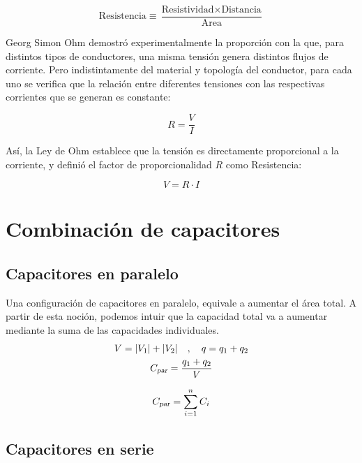 \documentclass[a5paper,12pt,twoside]{book}
\begin{document}
\begin{equation*}
    \text{Resistencia} \equiv \frac{\text{Resistividad} \times \text{Distancia}}{\text{Area}}
\end{equation*}

Georg Simon Ohm demostró experimentalmente la proporción con la que, para distintos tipos de conductores, una misma tensión genera distintos flujos de corriente. Pero indistintamente del material y topología del conductor, para cada uno se verifica que la relación entre diferentes tensiones con las respectivas corrientes que se generan es constante:

\begin{equation*}
    R = \frac{V}{I}
\end{equation*}

Así, la Ley de Ohm establece que la tensión es directamente proporcional a la corriente, y definió el factor de proporcionalidad $R$ como Resistencia:

\begin{equation}
    V = R \cdot I
\end{equation}


\section{Combinación de capacitores}


\subsection*{Capacitores en paralelo}

Una configuración de capacitores en paralelo, equivale a aumentar el área total. A partir de esta noción, podemos intuir que la capacidad total va a aumentar mediante la suma de las capacidades individuales.
\begin{gather*}
    V = {\left| {V_1} \right|} + {\left| {V_2} \right|} \quad , \quad q = q_1 + q_2
    \\
    {{C}_\textsl{{par}}} = \frac{q_1 + q_2}{V}
\end{gather*}

\begin{equation*}
    {{C}_\textsl{{par}}} = \sum_{i=1}^n C_i
\end{equation*}


\subsection*{Capacitores en serie}
\end{document}
